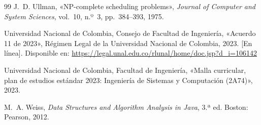 \documentclass[11pt,letterpaper]{article}
\begin{document}
\begin{thebibliography}{99}
 J.~D. Ullman, «NP-complete scheduling problems», \emph{Journal of Computer and System Sciences}, vol.~10, n.º~3, pp.~384--393, 1975.

 Universidad Nacional de Colombia, Consejo de Facultad de Ingeniería, «Acuerdo 11 de 2023», Régimen Legal de la Universidad Nacional de Colombia, 2023. [En línea]. Disponible en: \url{https://legal.unal.edu.co/rlunal/home/doc.jsp?d_i=106142}

 Universidad Nacional de Colombia, Facultad de Ingeniería, «Malla curricular, plan de estudios estándar 2023: Ingeniería de Sistemas y Computación (2A74)», 2023.

 M.~A. Weiss, \emph{Data Structures and Algorithm Analysis in Java}, 3.ª ed. Boston: Pearson, 2012.

\end{thebibliography}
\end{document}
